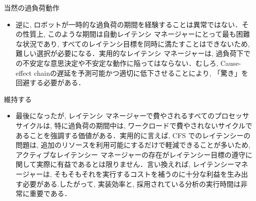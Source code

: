 \begin{frame}{当然の過負荷動作}
    \begin{itemize}
        \item 逆に, ロボットが一時的な過負荷の期間を経験することは異常ではない．その性質上, このような期間は自動レイテンシ マネージャーにとって最も困難な状況であり, すべてのレイテンシ目標を同時に満たすことはできないため, 難しい選択が必要になる．実用的なレイテンシ マネージャーは, 過負荷下での不安定な意思決定や不安定な動作に陥ってはならない．むしろ, Cause-effect chainの遅延を予測可能かつ適切に低下させることにより, 「驚き」を回避する必要がある．
    \end{itemize}
\end{frame}

\begin{frame}{維持する}
    \begin{itemize}
        \item 最後になったが, レイテンシ マネージャーで費やされるすべてのプロセッサ サイクルは, 特に過負荷の期間中は, ワークロードで費やされないサイクルであることを強調する価値がある．実用的に言えば, CFS でのレイテンシーの問題は, 追加のリソースを利用可能にするだけで軽減できることが多いため, アクティブなレイテンシー マネージャーの存在がレイテンシー目標の遵守に関して実際に有益であるとは限りません．言い換えれば, レイテンシーマネージャーは, そもそもそれを実行するコストを補うのに十分な利益を生み出す必要がある.したがって, 実装効率と, 採用されている分析の実行時間は非常に重要である．
    \end{itemize}
\end{frame}
